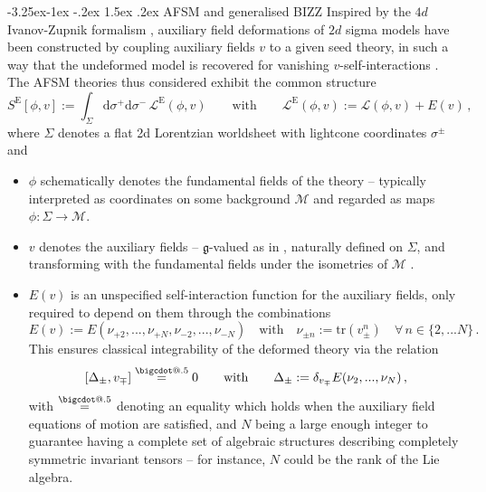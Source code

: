 \documentclass[12pt]{article}
\makeatletter
\newcommand*\bigcdot{\mathpalette\bigcdot@{.5}}
\newcommand*\bigcdot@[2]{\mathbin{\vcenter{\hbox{\scalebox{#2}{$\m@th#1\bullet$}}}}}
\newcommand{\deq}{\stackrel{\bigcdot}{=}}
\renewcommand\subsection{\@startsection{subsection}{2}{\z@}%
                                     {-3.25ex\@plus -1ex \@minus -.2ex}%
                                     {1.5ex \@plus .2ex}%
                                     {\normalfont\bfseries}}
\numberwithin{equation}{section}
\makeatother
\begin{document}
\subsection{AFSM and generalised BIZZ}
Inspired by the $4d$ Ivanov-Zupnik formalism \cite{Ivanov:2002ab,Ivanov:2003uj}, auxiliary field deformations of $2d$ sigma models have been constructed by coupling auxiliary fields $v$ to a given seed theory, in such a way that the undeformed model is recovered for vanishing $v$-self-interactions \cite{Ferko:2024ali}. The AFSM theories thus considered exhibit the common structure \cite{Bielli:2025uiv}
\begin{equation}\label{AF-lagrangian-common-structure}
S^{\text{E}}[\phi,v] := \int_{\Sigma}\mathrm{d}\sigma^{+}\mathrm{d}\sigma^{-} \, \mathcal{L}^{\text{E}}(\phi,v) 
\qquad \text{with} \qquad
\mathcal{L}^{\text{E}}(\phi,v) := \mathcal{L}(\phi,v) + E(v) \, ,
\end{equation}
where $\Sigma$ denotes a flat 2d Lorentzian worldsheet with lightcone coordinates $\sigma^{\pm}$ and
\begin{itemize}
\item $\phi$ schematically denotes the fundamental fields of the theory -- typically interpreted as coordinates on some background $\mathcal{M}$ and regarded as maps $\phi: \Sigma \rightarrow \mathcal{M}$.
\item $v$ denotes the auxiliary fields -- $\mathfrak{g}$-valued as in \cite{Ferko:2024ali,Bielli:2024khq,Bielli:2024ach,Bielli:2024fnp,Bielli:2024oif}, naturally defined on $\Sigma$, and transforming with the fundamental fields under the isometries of $\mathcal{M}$ \cite{Bielli:2024khq}.
\item $E(v)$ is an unspecified self-interaction function for the auxiliary fields, only required to depend on them through the combinations \cite{Bielli:2025uiv}
\begin{equation}\label{newE}
E(v):=E(\nu_{+2},...,\nu_{+N},\nu_{-2},...,\nu_{-N}) 
\quad \text{with} \quad
\nu_{\pm n}:=\mathrm{tr}(v_{\pm}^n) 
\quad \forall \, n\in \{2,...N\} \, .
\end{equation}
This ensures classical integrability of the deformed theory via the relation
\begin{equation}\label{deltapm_in_review_sec}
[\Delta_{\pm}, v_{\mp}] \deq 0
\qquad \text{with} \qquad 
\Delta_{\pm}:=\delta_{v_{\mp}}E(\nu_{2},...,\nu_{N}) \, ,
\end{equation}
with $\deq$ denoting an equality which holds when the auxiliary field equations of motion are satisfied, and $N$ being a large enough integer to guarantee having a complete set of algebraic structures describing completely symmetric invariant tensors -- for instance, $N$ could be the rank of the Lie algebra. 
\end{itemize}
\end{document}

